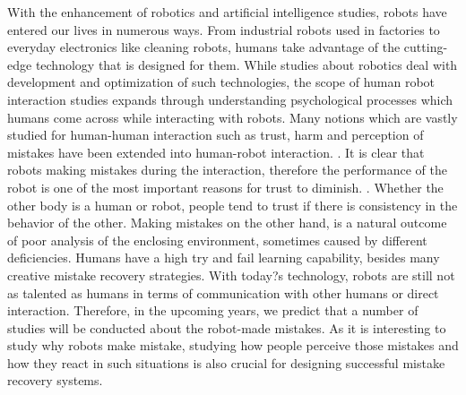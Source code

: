 \documentclass{sigchi}
\begin{document}
With the enhancement of robotics and artificial intelligence studies, robots have entered our lives in numerous ways. From industrial robots used in factories to everyday electronics like cleaning robots, humans take advantage of the cutting-edge technology that is designed for them. While studies about robotics deal with development and optimization of such technologies, the scope of human robot interaction studies expands through understanding psychological processes which humans come across while interacting with robots. Many notions which are vastly studied for human-human interaction such as trust, harm and perception of mistakes have been extended into human-robot interaction. \cite{freedy2007measurement}. It is clear that robots making mistakes during the interaction, therefore the performance of the robot is one of the most important reasons for trust to diminish. \cite{hancock2011meta}. Whether the other body is a human or robot, people tend to trust if there is consistency in the behavior of the other. Making mistakes on the other hand, is a natural outcome of poor analysis of the enclosing environment, sometimes caused by different deficiencies. Humans have a high try and fail learning capability, besides many creative mistake recovery strategies. With today?s technology, robots are still not as talented as humans in terms of communication with other humans or direct interaction. Therefore, in the upcoming years, we predict that a number of studies will be conducted about the robot-made mistakes. As it is interesting to study why robots make mistake, studying how people perceive those mistakes and how they react in such situations is also crucial for designing successful mistake recovery systems.
\end{document}

